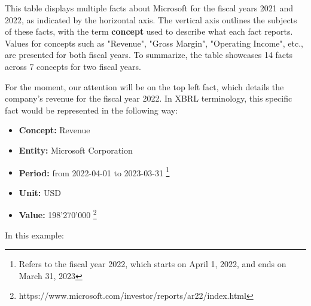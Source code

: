 
This table displays multiple facts about Microsoft for the fiscal years 2021 and 2022, as indicated by the horizontal axis.
The vertical axis outlines the subjects of these facts, with the term \textbf{concept} used to describe what each fact reports.
Values for concepts such as "Revenue", "Gross Margin", "Operating Income", etc., are presented for both fiscal years.
To summarize, the table showcases 14 facts across 7 concepts for two fiscal years.

For the moment, our attention will be on the top left fact, which details the company's revenue for the fiscal year 2022.
In XBRL terminology, this specific fact would be represented in the following way:

\begin{itemize}
    \item \textbf{Concept:} Revenue
    \item \textbf{Entity:} Microsoft Corporation
    \item \textbf{Period:} from 2022-04-01 to 2023-03-31 \footnote{Refers to the fiscal year 2022, which starts on April 1, 2022, and ends on March 31, 2023}
    \item \textbf{Unit:} USD
    \item \textbf{Value:} 198'270'000 \footnote{https://www.microsoft.com/investor/reports/ar22/index.html}
\end{itemize}

In this example:

